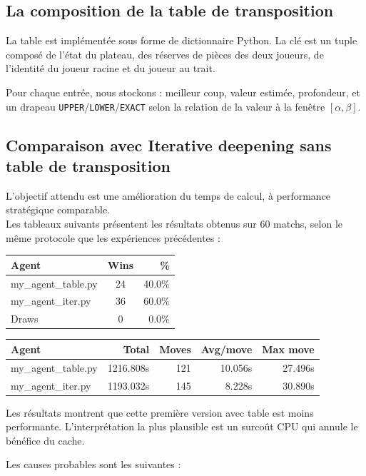 \subsection{La composition de la table de transposition}
La table est implémentée sous forme de dictionnaire Python. La clé est un tuple composé de l'état du plateau, des réserves de pièces des deux joueurs, de l'identité du joueur racine et du joueur au trait.

Pour chaque entrée, nous stockons : meilleur coup, valeur estimée, profondeur, et un drapeau \texttt{UPPER}/\texttt{LOWER}/\texttt{EXACT} selon la relation de la valeur à la fenêtre $[\alpha,\beta]$.

\subsection{Comparaison avec Iterative deepening sans table de transposition}

L'objectif attendu est une amélioration du temps de calcul, à performance stratégique comparable.\\

Les tableaux suivants présentent les résultats obtenus sur 60 matchs, selon le même protocole que les expériences précédentes :\\

\begin{tabular}{|l|c|r|}
    \hline
    Agent & Wins & \% \\
    \hline
    my\_agent\_table.py & 24 & 40.0\% \\
    my\_agent\_iter.py & 36 & 60.0\% \\
    Draws & 0 & 0.0\%\\
    \hline 
\end{tabular}
\begin{tabular}{|l|r|r|r|r|}
    \hline
    Agent & Total & Moves & Avg/move & Max move \\
    \hline
    my\_agent\_table.py & 1216.808s & 121 & 10.056s & 27.496s \\
    my\_agent\_iter.py & 1193.032s & 145 & 8.228s & 30.890s \\
    \hline
\end{tabular}

\bigskip

Les résultats montrent que cette première version avec table est moins performante. L'interprétation la plus plausible est un surcoût CPU qui annule le bénéfice du cache.

Les causes probables sont les suivantes : \\

